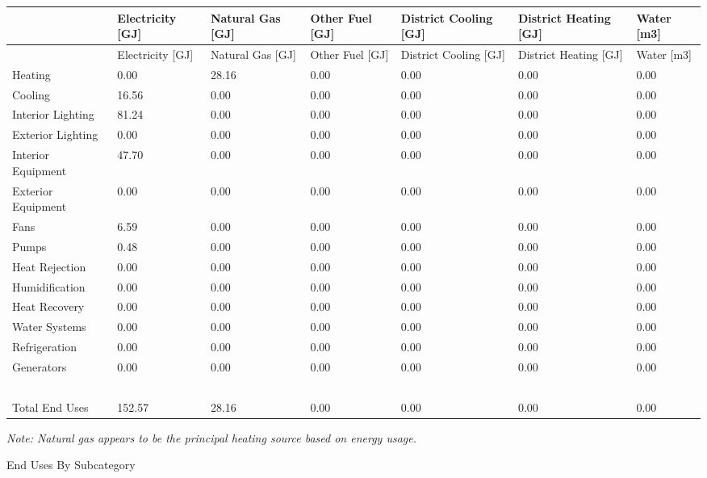 {\scriptsize
\begin{longtable}[c]{>{\raggedright}p{0.85in}>{\raggedright}p{0.85in}>{\raggedright}p{0.85in}>{\raggedright}p{0.85in}p{0.85in}p{0.85in}p{0.85in}}
\toprule
~ & Electricity [GJ] & Natural Gas [GJ] & Other Fuel [GJ] & District Cooling [GJ] & District Heating [GJ] & Water [m3] \tabularnewline
\midrule
\endfirsthead

\toprule
~ & Electricity [GJ] & Natural Gas [GJ] & Other Fuel [GJ] & District Cooling [GJ] & District Heating [GJ] & Water [m3] \tabularnewline
\midrule
\endhead

Heating & 0.00 & 28.16 & 0.00 & 0.00 & 0.00 & 0.00 \tabularnewline
Cooling & 16.56 & 0.00 & 0.00 & 0.00 & 0.00 & 0.00 \tabularnewline
Interior Lighting & 81.24 & 0.00 & 0.00 & 0.00 & 0.00 & 0.00 \tabularnewline
Exterior Lighting & 0.00 & 0.00 & 0.00 & 0.00 & 0.00 & 0.00 \tabularnewline
Interior Equipment & 47.70 & 0.00 & 0.00 & 0.00 & 0.00 & 0.00 \tabularnewline
Exterior Equipment & 0.00 & 0.00 & 0.00 & 0.00 & 0.00 & 0.00 \tabularnewline
Fans & 6.59 & 0.00 & 0.00 & 0.00 & 0.00 & 0.00 \tabularnewline
Pumps & 0.48 & 0.00 & 0.00 & 0.00 & 0.00 & 0.00 \tabularnewline
Heat Rejection & 0.00 & 0.00 & 0.00 & 0.00 & 0.00 & 0.00 \tabularnewline
Humidification & 0.00 & 0.00 & 0.00 & 0.00 & 0.00 & 0.00 \tabularnewline
Heat Recovery & 0.00 & 0.00 & 0.00 & 0.00 & 0.00 & 0.00 \tabularnewline
Water Systems & 0.00 & 0.00 & 0.00 & 0.00 & 0.00 & 0.00 \tabularnewline
Refrigeration & 0.00 & 0.00 & 0.00 & 0.00 & 0.00 & 0.00 \tabularnewline
Generators & 0.00 & 0.00 & 0.00 & 0.00 & 0.00 & 0.00 \tabularnewline
~ & ~ & ~ & ~ & ~ & ~ & ~ \tabularnewline
Total End Uses & 152.57 & 28.16 & 0.00 & 0.00 & 0.00 & 0.00 \tabularnewline
\bottomrule
\end{longtable}}

\emph{Note: Natural gas appears to be the principal heating source based on energy usage.}

End Uses By Subcategory

